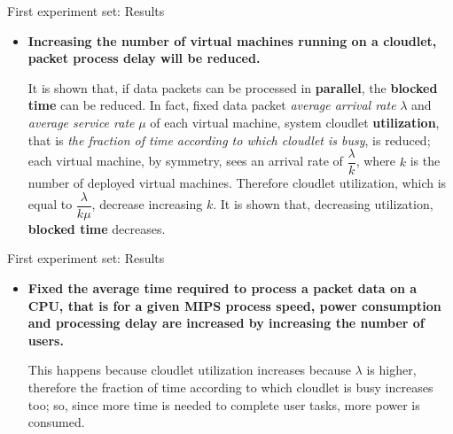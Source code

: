 \documentclass[10pt]{beamer}
\begin{document}
\begin{frame}{First experiment set: Results}

\begin{itemize}

\item \textbf{Increasing the number of virtual machines running on a cloudlet, packet process delay will be reduced.}

It is shown that, if data packets can be processed in \textbf{parallel}, the \textbf{blocked time} can be reduced. In fact, fixed data packet \textit{average arrival rate} $\lambda$ and \textit{average service rate} $\mu$ of each virtual machine, system cloudlet \textbf{utilization}, that is \textit{the fraction of time according to which cloudlet is busy}, is reduced; each virtual machine, by symmetry, sees an arrival rate of $\dfrac{\lambda}{k}$, where $k$ is the number of deployed virtual machines. Therefore cloudlet utilization, which is equal to $\dfrac{\lambda}{k\mu}$, decrease increasing $k$. It is shown that, decreasing utilization, \textbf{blocked time} decreases.\cite{BassSoftwareArchitecture2003}

\end{itemize}

\end{frame} 
\begin{frame}{First experiment set: Results}

\begin{itemize}

\item \textbf{Fixed the average time required to process a packet data on a CPU, that is for a given MIPS process speed, power consumption and processing delay are increased by increasing the number of users.} 

This happens because cloudlet utilization increases because $\lambda$ is higher, therefore the fraction of time according to which cloudlet is busy increases too; so, since more time is needed to complete user tasks, more power is consumed.

\end{itemize}

\end{frame} 
\end{document}

